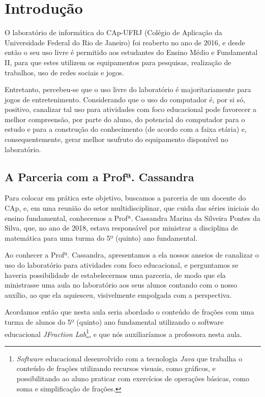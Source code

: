 \chapter{Introdução}\label{chp:LABEL_CHP_INT}

O laboratório de informática do CAp-UFRJ (Colégio de Aplicação da Universidade Federal do Rio de Janeiro) foi reaberto no ano de 2016, e desde então o seu uso livre é permitido aos estudantes do Ensino Médio e Fundamental II, para que estes utilizem os equipamentos para pesquisas, realização de trabalhos, uso de redes sociais e jogos.

Entretanto, percebeu-se que o uso livre do laboratório é majoritariamente para jogos de entretenimento. Considerando que o uso do computador é, por si só, positivo, canalizar tal uso para atividades com foco educacional pode favorecer a melhor compreensão, por parte do aluno, do potencial do computador para o estudo e para a construção do conhecimento (de acordo com a faixa etária) e, consequentemente, gerar melhor usufruto do equipamento disponível no laboratório.

\section{A Parceria com a Profª. Cassandra}\label{chp:LABEL_CHP_INT_SEC_PARC}

Para colocar em prática este objetivo, buscamos a parceria de um docente do CAp, e, em uma reunião do setor multidisciplinar, que cuida das séries iniciais do ensino fundamental, conhecemos a Profª. Cassandra Marina da Silveira Pontes da Silva, que, no ano de 2018, estava responsável por ministrar a disciplina de matemática para uma turma do 5º (quinto) ano fundamental.

Ao conhecer a Profª. Cassandra, apresentamos a ela nossos anseios de canalizar o uso do laboratório para atividades com foco educacional, e perguntamos se haveria possibilidade de estabelecermos uma parceria, de modo que ela ministrasse uma aula no laboratório aos seus alunos contando com o nosso auxílio, ao que ela aquiesceu, visivelmente empolgada com a perspectiva.

Acordamos então que nesta aula seria abordado o conteúdo de frações com uma turma de alunos do 5º (quinto) ano fundamental utilizando o software educacional \textit{JFraction Lab}\footnote{\textit{Software} educacional desenvolvido com a tecnologia \textit{Java} que trabalha o conteúdo de frações utilizando recursos visuais, como gráficos, e possibilitando ao aluno praticar com exercícios de operações básicas, como soma e simplificação de frações.}, e que nós auxiliaríamos a professora nesta aula.

